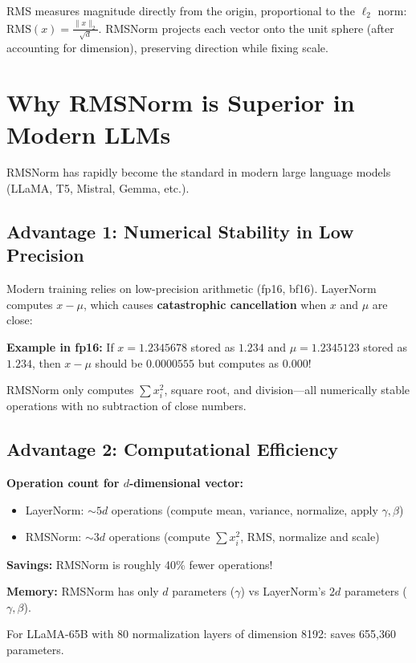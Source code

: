 \documentclass{article}
\begin{document}
RMS measures magnitude directly from the origin, proportional to the $\ell_2$ norm: $\text{RMS}(x) = \frac{\|x\|_2}{\sqrt{d}}$. RMSNorm projects each vector onto the unit sphere (after accounting for dimension), preserving direction while fixing scale.

\section{Why RMSNorm is Superior in Modern LLMs}

RMSNorm has rapidly become the standard in modern large language models (LLaMA, T5, Mistral, Gemma, etc.).

\subsection{Advantage 1: Numerical Stability in Low Precision}

Modern training relies on low-precision arithmetic (fp16, bf16). LayerNorm computes $x - \mu$, which causes \textbf{catastrophic cancellation} when $x$ and $\mu$ are close:

\textbf{Example in fp16:} If $x = 1.2345678$ stored as $1.234$ and $\mu = 1.2345123$ stored as $1.234$, then $x - \mu$ should be $0.0000555$ but computes as $0.000$!

RMSNorm only computes $\sum x_i^2$, square root, and division---all numerically stable operations with no subtraction of close numbers.

\subsection{Advantage 2: Computational Efficiency}

\textbf{Operation count for $d$-dimensional vector:}
\begin{itemize}
\item LayerNorm: $\sim 5d$ operations (compute mean, variance, normalize, apply $\gamma, \beta$)
\item RMSNorm: $\sim 3d$ operations (compute $\sum x_i^2$, RMS, normalize and scale)
\end{itemize}

\textbf{Savings:} RMSNorm is roughly 40\% fewer operations!

\textbf{Memory:} RMSNorm has only $d$ parameters ($\gamma$) vs LayerNorm's $2d$ parameters ($\gamma, \beta$).

For LLaMA-65B with 80 normalization layers of dimension 8192: saves 655,360 parameters.
\end{document}
